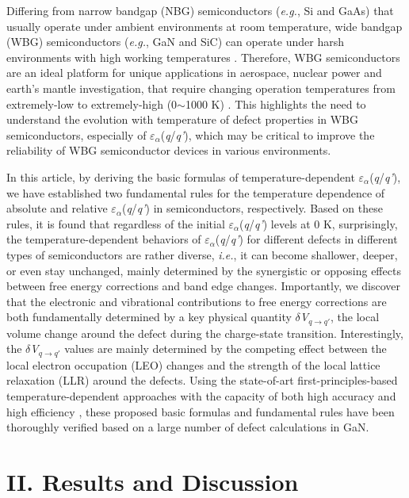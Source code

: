 \documentclass[onecolumn,preprint,superscriptaddress]{revtex4-1}
\begin{document}
Differing from narrow bandgap (NBG) semiconductors (\emph{e.g.}, Si and GaAs) that usually operate under ambient environments at room temperature, wide bandgap (WBG) semiconductors (\emph{e.g.}, GaN and SiC) can operate under harsh environments with high working temperatures \cite{20,21,22,23,24}. Therefore, WBG semiconductors are an ideal platform for unique applications in aerospace, nuclear power and earth's mantle investigation, that require changing operation temperatures from extremely-low to extremely-high (0$\sim$1000 K) \cite{20,21,22,23,24,25,26,27,28}. This highlights the need to understand the evolution with temperature of defect properties in WBG semiconductors, especially of $\varepsilon$$_{\alpha}$(\emph{q}/\emph{q'}), which may be critical to improve the reliability of WBG semiconductor devices in various environments.

In this article, by deriving the basic formulas of temperature-dependent $\varepsilon$$_{\alpha}$(\emph{q}/\emph{q'}), we have established two fundamental rules for the temperature dependence of absolute and relative $\varepsilon$$_{\alpha}$(\emph{q}/\emph{q'}) in semiconductors, respectively. Based on these rules, it is found that regardless of the initial $\varepsilon$$_{\alpha}$(\emph{q}/\emph{q'}) levels at 0 K, surprisingly, the temperature-dependent behaviors of $\varepsilon$$_{\alpha}$(\emph{q}/\emph{q'}) for different defects in different types of semiconductors are rather diverse, \emph{i.e.}, it can become shallower, deeper, or even stay unchanged, mainly determined by the synergistic or opposing effects between free energy corrections and band edge changes. Importantly, we discover that the electronic and vibrational contributions to free energy corrections are both fundamentally determined by a key physical quantity $\delta$\emph{V}$_{q\rightarrow q'}$, the local volume change around the defect during the charge-state transition. Interestingly, the $\delta$\emph{V}$_{q\rightarrow q'}$ values are mainly determined by the competing effect between the local electron occupation (LEO) changes and the strength of the local lattice relaxation (LLR) around the defects. Using the state-of-art first-principles-based temperature-dependent approaches with the capacity of both high accuracy and high efficiency \cite{51}, these proposed basic formulas and fundamental rules have been thoroughly verified based on a large number of defect calculations in GaN.
\section*{II. Results and Discussion}
\end{document}
